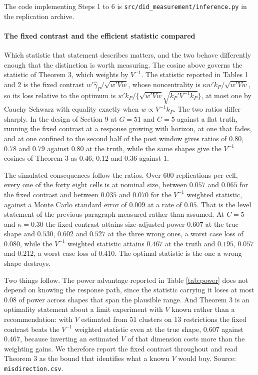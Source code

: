 \documentclass[12pt]{article}
\theoremstyle{definition}
\numberwithin{equation}{section}
\begin{document}
The code implementing Steps 1 to 6 is
\texttt{src/did\_measurement/inference.py} in the replication archive.

\paragraph{The fixed contrast and the efficient statistic compared}

Which statistic that statement describes matters, and the two behave
differently enough that the distinction is worth measuring. The cosine above
governs the statistic of Theorem 3, which weights by $V^{-1}$. The
statistic reported in Tables 1 and 2 is the fixed
contrast $w'\hat{\gamma}_P/\sqrt{w'Vw}$, whose noncentrality is $\kappa
w'k_P/\sqrt{w'Vw}$, so its loss relative to the optimum is
$w'k_P/\{\sqrt{w'Vw}\sqrt{k_P'V^{-1}k_P}\}$, at most one by Cauchy Schwarz with
equality exactly when $w \propto V^{-1}k_P$. The two ratios differ sharply. In
the design of Section 9 at $G = 51$ and $C = 5$ against a flat
truth, running the fixed contrast at a response growing with horizon, at one
that fades, and at one confined to the second half of the post window gives
ratios of $0.80$, $0.78$ and $0.79$ against $0.80$ at the truth, while the same
shapes give the $V^{-1}$ cosines of Theorem 3 as $0.46$, $0.12$
and $0.36$ against $1$.

The simulated consequences follow the ratios. Over $600$ replications per cell,
every one of the forty eight cells is at nominal size, between $0.057$ and
$0.065$ for the fixed contrast and between $0.035$ and $0.070$ for the $V^{-1}$
weighted statistic, against a Monte Carlo standard error of $0.009$ at a rate of
$0.05$. That is the level statement of the previous paragraph measured rather
than assumed. At $C = 5$ and $\kappa = 0.30$ the fixed contrast attains size-adjusted power $0.607$ at the true shape and $0.530$, $0.602$ and $0.527$ at the
three wrong ones, a worst case loss of $0.080$, while the $V^{-1}$ weighted
statistic attains $0.467$ at the truth and $0.195$, $0.057$ and $0.212$, a worst
case loss of $0.410$. The optimal statistic is the one a wrong shape destroys.

Two things follow. The power advantage reported in Table \ref{tab:power} does
not depend on knowing the response path, since the statistic carrying it loses
at most $0.08$ of power across shapes that span the plausible range. And Theorem
3 is an optimality statement about a limit experiment with $V$
known rather than a recommendation: with $V$ estimated from $51$ clusters on
$13$ restrictions the fixed contrast beats the $V^{-1}$ weighted statistic even
at the true shape, $0.607$ against $0.467$, because inverting an estimated $V$ of
that dimension costs more than the weighting gains. We therefore report the
fixed contrast throughout and read Theorem 3 as the bound that
identifies what a known $V$ would buy. Source: \texttt{misdirection.csv}.
\end{document}
